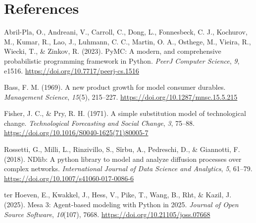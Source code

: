\documentclass[10pt,a4paper,onecolumn]{article}
\newlength{\cslhangindent}
\newenvironment{CSLReferences}[2] %
 {\begin{list}{}{%
  \setlength{\itemindent}{0pt}
  \setlength{\leftmargin}{0pt}
  \setlength{\parsep}{0pt}
  \ifodd #1
   \setlength{\leftmargin}{\cslhangindent}
   \setlength{\itemindent}{-1\cslhangindent}
  \fi
  \setlength{\itemsep}{#2\baselineskip}}}
 {\end{list}}
\begin{document}
\section*{References}\label{references}

\protect{}\label{refs}
\begin{CSLReferences}{1}{0.5}
Abril-Pla, O., Andreani, V., Carroll, C., Dong, L., Fonnesbeck, C. J.,
Kochurov, M., Kumar, R., Lao, J., Luhmann, C. C., Martin, O. A.,
Osthege, M., Vieira, R., Wiecki, T., \& Zinkov, R. (2023). {PyMC}: A
modern, and comprehensive probabilistic programming framework in
{Python}. \emph{PeerJ Computer Science}, \emph{9}, e1516.
\url{https://doi.org/10.7717/peerj-cs.1516}

Bass, F. M. (1969). A new product growth for model consumer durables.
\emph{Management Science}, \emph{15}(5), 215--227.
\url{https://doi.org/10.1287/mnsc.15.5.215}

Fisher, J. C., \& Pry, R. H. (1971). A simple substitution model of
technological change. \emph{Technological Forecasting and Social
Change}, \emph{3}, 75--88.
\url{https://doi.org/10.1016/S0040-1625(71)80005-7}

Rossetti, G., Milli, L., Rinzivillo, S., Sîrbu, A., Pedreschi, D., \&
Giannotti, F. (2018). {NDlib}: A python library to model and analyze
diffusion processes over complex networks. \emph{International Journal
of Data Science and Analytics}, \emph{5}, 61--79.
\url{https://doi.org/10.1007/s41060-017-0086-6}

ter Hoeven, E., Kwakkel, J., Hess, V., Pike, T., Wang, B., Rht, \&
Kazil, J. (2025). {Mesa} 3: Agent-based modeling with {Python} in 2025.
\emph{Journal of Open Source Software}, \emph{10}(107), 7668.
\url{https://doi.org/10.21105/joss.07668}

\end{CSLReferences}
\end{document}
